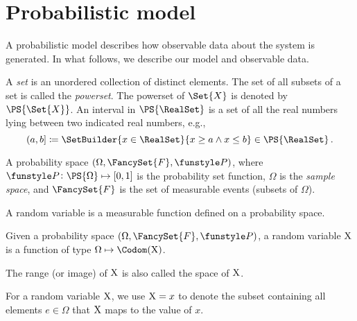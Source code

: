 \documentclass[../main.tex]{subfiles}
\begin{document}
\chapter{Probabilistic model}
\label{sec:general_series_system}

A probabilistic model describes how observable data about the system is generated.
In what follows, we describe our model and observable data.

A \emph{set} is an unordered collection of distinct elements.
The set of all subsets of a set is called the \emph{powerset}.
The powerset of $\Set{X}$ is denoted by $\PS{\Set{X}}$.
An interval in $\PS{\RealSet}$ is a set of all the real numbers lying between two indicated real numbers, e.g.,
\begin{equation}
	(a,b] \coloneqq \SetBuilder{x \in \RealSet}{x \geq a \land x \leq b} \in \PS{\RealSet}\,.
\end{equation}

\begin{definition}
A probability space $(\Omega, \FancySet{F}, \Fun{P})$, where $\Fun{P} \colon \PS{\Omega} \mapsto [0,1]$ is the probability set function, $\Omega$ is the \emph{sample space}, and $\FancySet{F}$ is the set of measurable events (subsets of $\Omega$).
\end{definition}


A random variable is a measurable function defined on a probability space.
\begin{definition}
Given a probability space $(\Omega, \FancySet{F}, \Fun{P})$, a random variable $\mathrm{X}$ is a function of type $\Omega \mapsto \Codom(\RV{X})$.
\end{definition}
The range (or image) of $\mathrm{X}$ is also called the space of $\mathrm{X}$.

For a random variable $\mathrm{X}$, we use $\mathrm{X} = x$ to denote the subset containing all elements $e \in \Omega$ that $\mathrm{X}$ maps to the value of $x$.
\end{document}
